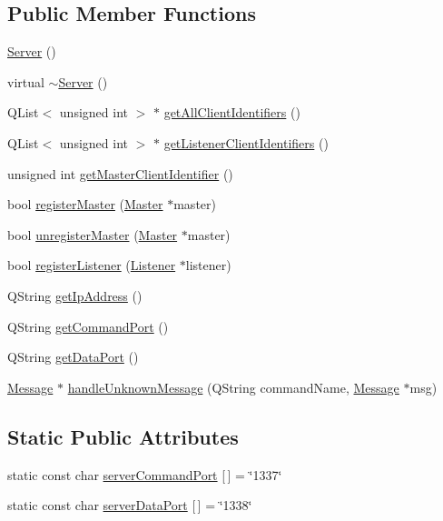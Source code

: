 \subsection*{Public Member Functions}
\begin{DoxyCompactItemize}
\item 
\hyperlink{class_server_appl_1_1_server_aa3d3935f49c69eee2c6c01930484ba71}{Server} ()
\item 
virtual \hyperlink{class_server_appl_1_1_server_a92f2b83a24b4e147236b7478428e66b5}{$\sim$\+Server} ()
\item 
Q\+List$<$ unsigned int $>$ $\ast$ \hyperlink{class_server_appl_1_1_server_a90caf0a64ec60c7161c6a8dd97898dfc}{get\+All\+Client\+Identifiers} ()
\item 
Q\+List$<$ unsigned int $>$ $\ast$ \hyperlink{class_server_appl_1_1_server_a1eca13e8d3dff6b2ab21f82d0988c409}{get\+Listener\+Client\+Identifiers} ()
\item 
unsigned int \hyperlink{class_server_appl_1_1_server_a7ebe02fbc00cda690d65ec95933d7249}{get\+Master\+Client\+Identifier} ()
\item 
bool \hyperlink{class_server_appl_1_1_server_a443a30c3ca056aa0d9b69c9dd64dac43}{register\+Master} (\hyperlink{class_server_appl_1_1_master}{Master} $\ast$master)
\item 
bool \hyperlink{class_server_appl_1_1_server_a6bed16ae8613fde254ff64dd5af6c4b5}{unregister\+Master} (\hyperlink{class_server_appl_1_1_master}{Master} $\ast$master)
\item 
bool \hyperlink{class_server_appl_1_1_server_a0aed20fb7741d027bb281e5cf09f8280}{register\+Listener} (\hyperlink{class_server_appl_1_1_listener}{Listener} $\ast$listener)
\item 
Q\+String \hyperlink{class_server_appl_1_1_server_aae7a507d8f1619998393fd406a35af69}{get\+Ip\+Address} ()
\item 
Q\+String \hyperlink{class_server_appl_1_1_server_a83c0d28b5a6a64900165540ea3982fe5}{get\+Command\+Port} ()
\item 
Q\+String \hyperlink{class_server_appl_1_1_server_a34b5eadf81712a8c055aa41c8ad09d14}{get\+Data\+Port} ()
\item 
\hyperlink{class_message}{Message} $\ast$ \hyperlink{class_server_appl_1_1_server_a42d7f3a2bb9cb905f68b8979b0a398ce}{handle\+Unknown\+Message} (Q\+String command\+Name, \hyperlink{class_message}{Message} $\ast$msg)
\end{DoxyCompactItemize}
\subsection*{Static Public Attributes}
\begin{DoxyCompactItemize}
\item 
static const char \hyperlink{class_server_appl_1_1_server_abfeaa964d428c04cb8e9f5562c08326f}{server\+Command\+Port} \mbox{[}$\,$\mbox{]} = \char`\"{}1337\char`\"{}
\item 
static const char \hyperlink{class_server_appl_1_1_server_a37097612fb76a9b0eabf26af42db1019}{server\+Data\+Port} \mbox{[}$\,$\mbox{]} = \char`\"{}1338\char`\"{}
\end{DoxyCompactItemize}


